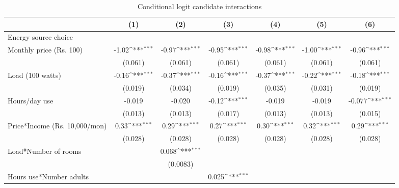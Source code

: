 \begin{table}[htbp]\centering
\def\sym#1{\ifmmode^{#1}\else\(^{#1}\)\fi}
\caption{Conditional logit candidate interactions}
\begin{tabular*}{1\hsize}{@{\hskip\tabcolsep\extracolsep\fill}l*{6}{c}}
\toprule
                &\multicolumn{1}{c}{(1)}         &\multicolumn{1}{c}{(2)}         &\multicolumn{1}{c}{(3)}         &\multicolumn{1}{c}{(4)}         &\multicolumn{1}{c}{(5)}         &\multicolumn{1}{c}{(6)}         \\
\midrule
Energy source choice&                  &                  &                  &                  &                  &                  \\
Monthly price (Rs. 100)&    -1.02\sym{***}&    -0.97\sym{***}&    -0.95\sym{***}&    -0.98\sym{***}&    -1.00\sym{***}&    -0.96\sym{***}\\
                &  (0.061)         &  (0.061)         &  (0.061)         &  (0.061)         &  (0.061)         &  (0.061)         \\
Load (100 watts)&    -0.16\sym{***}&    -0.37\sym{***}&    -0.16\sym{***}&    -0.37\sym{***}&    -0.22\sym{***}&    -0.18\sym{***}\\
                &  (0.019)         &  (0.034)         &  (0.019)         &  (0.035)         &  (0.031)         &  (0.019)         \\
Hours/day use   &   -0.019         &   -0.020         &    -0.12\sym{***}&   -0.019         &   -0.019         &   -0.077\sym{***}\\
                &  (0.013)         &  (0.013)         &  (0.017)         &  (0.013)         &  (0.013)         &  (0.015)         \\
Price*Income (Rs. 10,000/mon)&     0.33\sym{***}&     0.29\sym{***}&     0.27\sym{***}&     0.30\sym{***}&     0.32\sym{***}&     0.29\sym{***}\\
                &  (0.028)         &  (0.028)         &  (0.028)         &  (0.028)         &  (0.028)         &  (0.028)         \\
Load*Number of rooms&                  &    0.068\sym{***}&                  &                  &                  &                  \\
                &                  & (0.0083)         &                  &                  &                  &                  \\
Hours use*Number adults&                  &                  &    0.025\sym{***}&                  &                  &                  \\

\end{tabular*}
\end{table}
